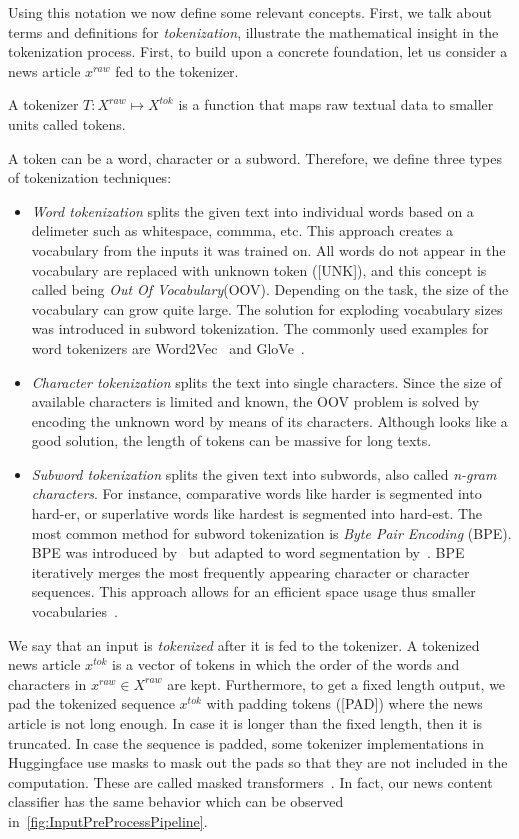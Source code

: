 Using this notation we now define some relevant concepts. First, we talk about terms and definitions for \emph{tokenization}, illustrate the mathematical insight in the tokenization process. First, to build upon a concrete foundation, let us consider a news article $x^{raw}$ fed to the tokenizer.
\begin{definition}
    A tokenizer $T:X^{raw} \mapsto X^{tok}$ is a function that maps raw textual data to smaller units called tokens.
\end{definition}
A token can be a word, character or a subword. Therefore, we define three types of tokenization techniques:
\begin{itemize}
    \item \emph{Word tokenization} splits the given text into individual words based on a delimeter such as whitespace, commma, etc. This approach creates a vocabulary from the inputs it was trained on. All words do not appear in the vocabulary are replaced with unknown token ([UNK]), and this concept is called being \emph{Out Of Vocabulary}(OOV). Depending on the task, the size of the vocabulary can grow quite large. The solution for exploding vocabulary sizes was introduced in subword tokenization. The commonly used examples for word tokenizers are Word2Vec~\parencite{Word2Vec_Mikolov} and GloVe~\parencite{GloVe_Pennington}.
    \item \emph{Character tokenization} splits the text into single characters. Since the size of available characters is limited and known, the OOV problem is solved by encoding the unknown word by means of its characters. Although looks like a good solution, the length of tokens can be massive for long texts.
    \item \emph{Subword tokenization} splits the given text into subwords, also called \emph{n-gram characters}. For instance, comparative words like harder is segmented into hard-er, or superlative words like hardest is segmented into hard-est. The most common method for subword tokenization is \emph{Byte Pair Encoding} (BPE). BPE was introduced by~\cite{ANewAlgorithmForDataCompression_Gage} but adapted to word segmentation by~\cite{NeuralMachineTranslationOfRareWords_Sennrich}. BPE iteratively merges the most frequently appearing character or character sequences. This approach allows for an efficient space usage thus smaller vocabularies~\parencite{NeuralMachineTranslationOfRareWords_Sennrich}.
\end{itemize}
We say that an input is \emph{tokenized} after it is fed to the tokenizer. A tokenized news article $x^{tok}$ is a vector of tokens in which the order of the words and characters in $x^{raw} \in X^{raw}$ are kept. Furthermore, to get a fixed length output, we pad the tokenized sequence $x^{tok}$ with padding tokens ([PAD]) where the news article is not long enough. In case it is longer than the fixed length, then it is truncated. In case the sequence is padded, some tokenizer implementations in Huggingface use masks to mask out the pads so that they are not included in the computation. These are called masked transformers~\parencite{Transformers_Wolf}. In fact, our news content classifier has the same behavior which can be observed in~\ref{fig:InputPreProcessPipeline}.

